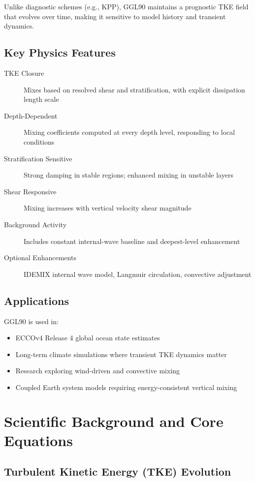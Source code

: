 \documentclass[11pt, a4paper]{article}
\begin{document}
Unlike diagnostic schemes (e.g., KPP), GGL90 maintains a prognostic TKE field that evolves over time, making it sensitive to model history and transient dynamics.

\subsection{Key Physics Features}

\begin{description}
    \item[TKE Closure] Mixes based on resolved shear and stratification, with explicit dissipation length scale
    \item[Depth-Dependent] Mixing coefficients computed at every depth level, responding to local conditions
    \item[Stratification Sensitive] Strong damping in stable regions; enhanced mixing in unstable layers
    \item[Shear Responsive] Mixing increases with vertical velocity shear magnitude
    \item[Background Activity] Includes constant internal-wave baseline and deepest-level enhancement
    \item[Optional Enhancements] IDEMIX internal wave model, Langmuir circulation, convective adjustment
\end{description}

\subsection{Applications}

GGL90 is used in:

\begin{itemize}
    \item ECCOv4 Release 4 global ocean state estimates
    \item Long-term climate simulations where transient TKE dynamics matter
    \item Research exploring wind-driven and convective mixing
    \item Coupled Earth system models requiring energy-consistent vertical mixing
\end{itemize}

\section{Scientific Background and Core Equations}

\subsection{Turbulent Kinetic Energy (TKE) Evolution}
\end{document}
